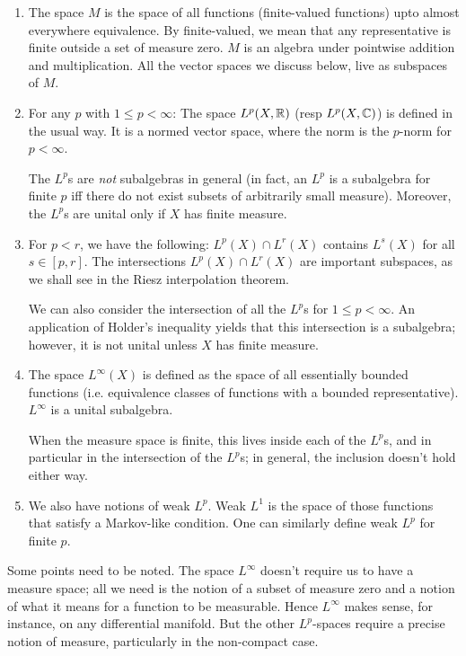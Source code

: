 \documentclass[a4paper]{amsart}
\begin{document}
\begin{enumerate}

\item The space $M$ is the space of all functions (finite-valued
  functions) upto almost everywhere equivalence. By finite-valued, we
  mean that any representative is finite outside a set of measure
  zero. $M$ is an algebra under pointwise addition and
  multiplication. All the vector spaces we discuss below, live as
  subspaces of $M$.

\item For any $p$ with $1 \le p < \infty$: The space $L^p(X,\mathbb{R})$
  (resp $L^p(X,\mathbb{C})$) is defined in the usual way. It is a normed
  vector space, where the norm is the $p$-norm for $p < \infty$.

  The $L^p$s are {\em not} subalgebras in general (in fact, an $L^p$
  is a subalgebra for finite $p$ iff there do not exist subsets of
  arbitrarily small measure). Moreover, the $L^p$s are unital only if
  $X$ has finite measure.

\item For $p < r$, we have the following: $L^p(X) \cap L^r(X)$
  contains $L^s(X)$ for all $s \in [p,r]$.  The intersections $L^p(X)
  \cap L^r(X)$ are important subspaces, as we shall see in the Riesz
  interpolation theorem.

  We can also consider the intersection of all the $L^p$s for $1 \le p
  < \infty$. An application of Holder's inequality yields that this
  intersection is a subalgebra; however, it is not unital unless $X$
  has finite measure.

\item The space $L^\infty(X)$ is defined as the space of all
  essentially bounded functions (i.e. equivalence classes of functions
  with a bounded representative). $L^\infty$ is a unital subalgebra.

  When the measure space is finite, this lives inside each of the
  $L^p$s, and in particular in the intersection of the $L^p$s; in
  general, the inclusion doesn't hold either way.

\item We also have notions of weak $L^p$. Weak $L^1$ is the space of
  those functions that satisfy a Markov-like condition. One can
  similarly define weak $L^p$ for finite $p$.
\end{enumerate}

Some points need to be noted. The space $L^\infty$ doesn't require us
to have a measure space; all we need is the notion of a subset of
measure zero and a notion of what it means for a function to be
measurable. Hence $L^\infty$ makes sense, for instance, on any
differential manifold. But the other $L^p$-spaces require a precise
notion of measure, particularly in the non-compact case.
\end{document}
